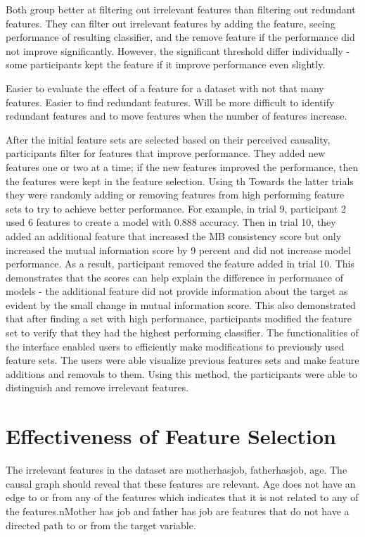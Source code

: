 Both group better at filtering out irrelevant features than filtering out redundant features. They can filter out irrelevant features by adding the feature, seeing performance of resulting classifier, and the remove feature if the performance did not improve significantly. However, the significant threshold differ individually - some participants kept the feature if it improve performance even slightly.

Easier to evaluate the effect of a feature for a dataset with not that many features. Easier to find redundant features. Will be more difficult to identify redundant features and to move features when the number of features increase.

After the initial feature sets are selected based on their perceived causality, participants filter for features that improve performance. They added new features one or two at a time; if the new features improved the performance, then the features were kept in the feature selection. Using th Towards the latter trials they were randomly adding or removing features from high performing feature sets to try to achieve better performance. For example, in trial 9, participant 2 used 6 features to create a model with 0.888 accuracy. Then in trial 10, they added an additional feature that increased the MB consistency score but only increased the mutual information score by 9 percent and did not increase model performance. As a result, participant removed the feature added in trial 10. This demonstrates that the scores can help explain the difference in performance of models - the additional feature did not provide information about the target as evident by the small change in mutual information score. This also demonstrated that after finding a set with high performance, participants modified the feature set to verify that they had the highest performing classifier. The functionalities of the interface enabled users to efficiently make modifications to previously used feature sets. The users were able visualize previous features sets and make feature additions and removals to them. Using this method, the participants were able to distinguish and remove irrelevant features.



\section { Effectiveness of Feature Selection }
The irrelevant features in the dataset are motherhasjob, fatherhasjob, age. The causal graph should reveal that these features are relevant. Age does not have an edge to or from any of the features which indicates that it is not related to any of the features.nMother has job and father has job are features that do not have a directed path to or from the target variable.


